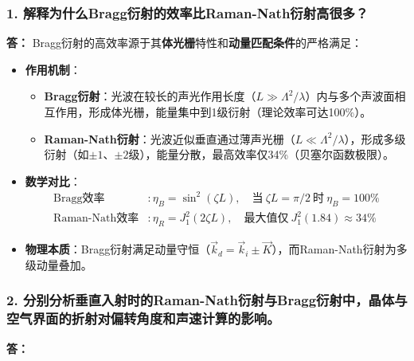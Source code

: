 \documentclass[12pt,a4paper,UTF8]{ctexart}
\begin{document}
\subsubsection*{1. 解释为什么Bragg衍射的效率比Raman-Nath衍射高很多？}
\textbf{答：}
Bragg衍射的高效率源于其\textbf{体光栅}特性和\textbf{动量匹配条件}的严格满足\cite{xujieping200x}：

\begin{itemize}
    \item \textbf{作用机制}：
    \begin{itemize}
        \item \textbf{Bragg衍射}：光波在较长的声光作用长度（$L \gg \Lambda^2/\lambda$）内与多个声波面相互作用，形成体光栅，能量集中到1级衍射（理论效率可达100\%）。
        \item \textbf{Raman-Nath衍射}：光波近似垂直通过薄声光栅（$L \ll \Lambda^2/\lambda$），形成多级衍射（如$\pm1$、$\pm2$级），能量分散，最高效率仅34\%（贝塞尔函数极限）。
    \end{itemize}
    
    \item \textbf{数学对比}：
    \begin{align*}
        \text{Bragg效率} &: \eta_B = \sin^2(\zeta L), \quad \text{当} \ \zeta L = \pi/2 \ \text{时} \ \eta_B = 100\% \\
        \text{Raman-Nath效率} &: \eta_R = J_1^2(2\zeta L), \quad \text{最大值仅} \ J_1^2(1.84) \approx 34\%
    \end{align*}
    
    \item \textbf{物理本质}：Bragg衍射满足动量守恒（$\vec{k}_d = \vec{k}_i \pm \vec{K}$），而Raman-Nath衍射为多级动量叠加。
\end{itemize}

\subsubsection*{2. 分别分析垂直入射时的Raman-Nath衍射与Bragg衍射中，晶体与空气界面的折射对偏转角度和声速计算的影响。}
\textbf{答：}
\end{document}
